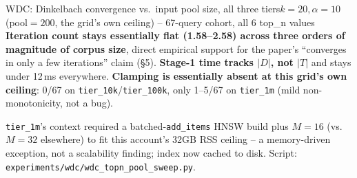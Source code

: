 \documentclass[aspectratio=169,10pt]{beamer}
\newcommand{\highlight}[1]{{\color{Cat1}\bfseries #1}}
\begin{document}
\begin{frame}{WDC: Dinkelbach convergence vs.\ input pool size, all three tiers}{$k{=}20,\alpha{=}10$ (pool$=200$, the grid's own ceiling) -- 67-query cohort, all 6 top\_n values}
\vspace{4pt}
\footnotesize
\highlight{Iteration count stays essentially flat (1.58--2.58) across three orders of magnitude of corpus size}, direct empirical support for the paper's ``converges in only a few iterations'' claim (\S5). \highlight{Stage-1 time tracks $|D|$, not $|T|$} and stays under 12\,ms everywhere. \highlight{Clamping is essentially absent at this grid's own ceiling}: 0/67 on \texttt{tier\_10k}/\texttt{tier\_100k}, only 1--5/67 on \texttt{tier\_1m} (mild non-monotonicity, not a bug).

\vspace{2pt}
{\footnotesize\color{Muted} \texttt{tier\_1m}'s context required a batched-\texttt{add\_items} HNSW build plus $M{=}16$ (vs.\ $M{=}32$ elsewhere) to fit this account's 32GB RSS ceiling -- a memory-driven exception, not a scalability finding; index now cached to disk. Script: \texttt{experiments/wdc/wdc\_topn\_pool\_sweep.py}.}
\end{frame}
\end{document}
